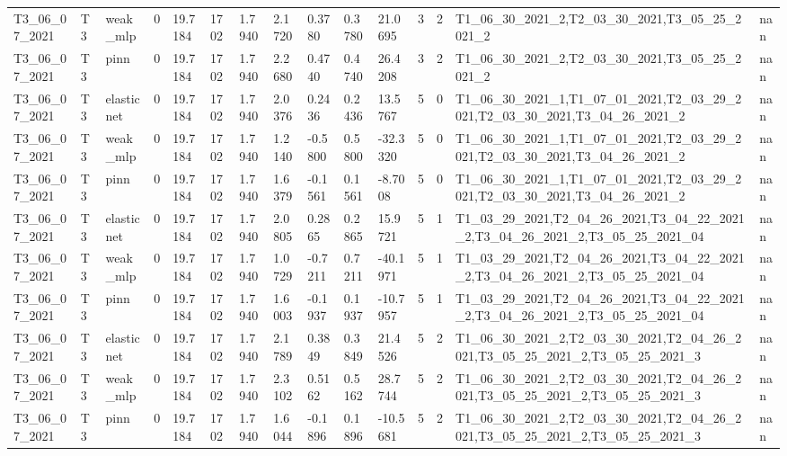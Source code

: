 \begin{table}[t]
\begin{tabular}{lllllllllllllll}
T3\_06\_07\_2021 & T3 & weak\_mlp & 0 & 19.7184 & 1702 & 1.7940 & 2.1720 & 0.3780 & 0.3780 & 21.0695 & 3 & 2 & T1\_06\_30\_2021\_2,T2\_03\_30\_2021,T3\_05\_25\_2021\_2 & nan \\
T3\_06\_07\_2021 & T3 & pinn & 0 & 19.7184 & 1702 & 1.7940 & 2.2680 & 0.4740 & 0.4740 & 26.4208 & 3 & 2 & T1\_06\_30\_2021\_2,T2\_03\_30\_2021,T3\_05\_25\_2021\_2 & nan \\
T3\_06\_07\_2021 & T3 & elasticnet & 0 & 19.7184 & 1702 & 1.7940 & 2.0376 & 0.2436 & 0.2436 & 13.5767 & 5 & 0 & T1\_06\_30\_2021\_1,T1\_07\_01\_2021,T2\_03\_29\_2021,T2\_03\_30\_2021,T3\_04\_26\_2021\_2 & nan \\
T3\_06\_07\_2021 & T3 & weak\_mlp & 0 & 19.7184 & 1702 & 1.7940 & 1.2140 & -0.5800 & 0.5800 & -32.3320 & 5 & 0 & T1\_06\_30\_2021\_1,T1\_07\_01\_2021,T2\_03\_29\_2021,T2\_03\_30\_2021,T3\_04\_26\_2021\_2 & nan \\
T3\_06\_07\_2021 & T3 & pinn & 0 & 19.7184 & 1702 & 1.7940 & 1.6379 & -0.1561 & 0.1561 & -8.7008 & 5 & 0 & T1\_06\_30\_2021\_1,T1\_07\_01\_2021,T2\_03\_29\_2021,T2\_03\_30\_2021,T3\_04\_26\_2021\_2 & nan \\
T3\_06\_07\_2021 & T3 & elasticnet & 0 & 19.7184 & 1702 & 1.7940 & 2.0805 & 0.2865 & 0.2865 & 15.9721 & 5 & 1 & T1\_03\_29\_2021,T2\_04\_26\_2021,T3\_04\_22\_2021\_2,T3\_04\_26\_2021\_2,T3\_05\_25\_2021\_04 & nan \\
T3\_06\_07\_2021 & T3 & weak\_mlp & 0 & 19.7184 & 1702 & 1.7940 & 1.0729 & -0.7211 & 0.7211 & -40.1971 & 5 & 1 & T1\_03\_29\_2021,T2\_04\_26\_2021,T3\_04\_22\_2021\_2,T3\_04\_26\_2021\_2,T3\_05\_25\_2021\_04 & nan \\
T3\_06\_07\_2021 & T3 & pinn & 0 & 19.7184 & 1702 & 1.7940 & 1.6003 & -0.1937 & 0.1937 & -10.7957 & 5 & 1 & T1\_03\_29\_2021,T2\_04\_26\_2021,T3\_04\_22\_2021\_2,T3\_04\_26\_2021\_2,T3\_05\_25\_2021\_04 & nan \\
T3\_06\_07\_2021 & T3 & elasticnet & 0 & 19.7184 & 1702 & 1.7940 & 2.1789 & 0.3849 & 0.3849 & 21.4526 & 5 & 2 & T1\_06\_30\_2021\_2,T2\_03\_30\_2021,T2\_04\_26\_2021,T3\_05\_25\_2021\_2,T3\_05\_25\_2021\_3 & nan \\
T3\_06\_07\_2021 & T3 & weak\_mlp & 0 & 19.7184 & 1702 & 1.7940 & 2.3102 & 0.5162 & 0.5162 & 28.7744 & 5 & 2 & T1\_06\_30\_2021\_2,T2\_03\_30\_2021,T2\_04\_26\_2021,T3\_05\_25\_2021\_2,T3\_05\_25\_2021\_3 & nan \\
T3\_06\_07\_2021 & T3 & pinn & 0 & 19.7184 & 1702 & 1.7940 & 1.6044 & -0.1896 & 0.1896 & -10.5681 & 5 & 2 & T1\_06\_30\_2021\_2,T2\_03\_30\_2021,T2\_04\_26\_2021,T3\_05\_25\_2021\_2,T3\_05\_25\_2021\_3 & nan \\

\end{tabular}
\end{table}
